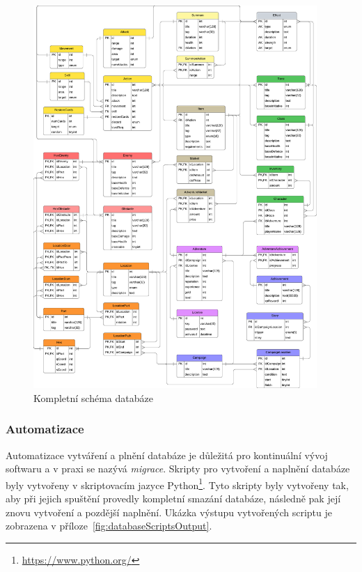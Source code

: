\begin{figure}[H]
    \centering
    \includegraphics[width=0.96\textwidth]{../../shared/diagrams/dbScheme}
    \caption{Kompletní schéma databáze}
    \label{fig:db_scheme}
\end{figure}

\subsubsection*{Automatizace}
\label{subsubsec:implementation-technologies-database-automatization}
Automatizace vytváření a plnění databáze je důležitá pro kontinuální vývoj softwaru a v praxi se nazývá \textit{migrace}. Skripty pro vytvoření a naplnění databáze byly vytvořeny v skriptovacím jazyce Python\footnote{\href{https://www.python.org/}{https://www.python.org/}}. Tyto skripty byly vytvořeny tak, aby při jejich spuštění provedly kompletní smazání databáze, následně pak její znovu vytvoření a pozdější naplnění. Ukázka výstupu vytvořených scriptu je zobrazena v příloze~\ref{fig:databaseScriptsOutput}.

